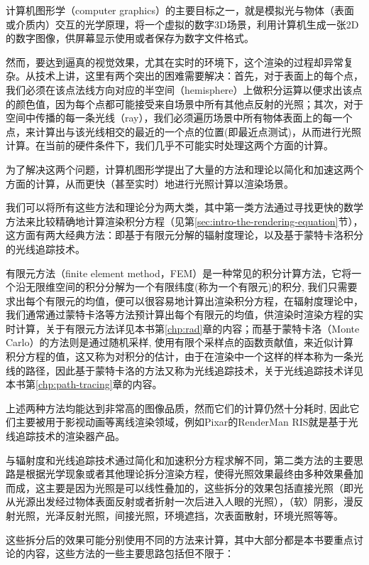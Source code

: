 计算机图形学（computer graphics）的主要目标之一，就是模拟光与物体（表面或介质内）交互的光学原理，将一个虚拟的数字3D场景，利用计算机生成一张2D的数字图像，供屏幕显示使用或者保存为数字文件格式。

然而，要达到逼真的视觉效果，尤其在实时的环境下，这个渲染的过程却异常复杂。从技术上讲，这里有两个突出的困难需要解决：首先，对于表面上的每个点，我们必须在该点法线方向对应的半空间（hemisphere）上做积分运算以便求出该点的颜色值，因为每个点都可能接受来自场景中所有其他点反射的光照；其次，对于空间中传播的每一条光线（ray），我们必须遍历场景中所有物体表面上的每一个点，来计算出与该光线相交的最近的一个点的位置(即最近点测试)，从而进行光照计算。在当前的硬件条件下，我们几乎不可能实时处理这两个方面的计算。

为了解决这两个问题，计算机图形学提出了大量的方法和理论以简化和加速这两个方面的计算，从而更快（甚至实时）地进行光照计算以渲染场景。

我们可以将所有这些方法和理论分为两大类，其中第一类方法通过寻找更快的数学方法来比较精确地计算渲染积分方程（见第\ref{sec:intro-the-rendering-equation}节），这方面有两大经典方法：即基于有限元分解的辐射度理论，以及基于蒙特卡洛积分的光线追踪技术。

有限元方法（finite element method，FEM）是一种常见的积分计算方法，它将一个沿无限维空间的积分分解为一个有限纬度(称为一个有限元)的积分, 我们只需要求出每个有限元的均值，便可以很容易地计算出渲染积分方程，在辐射度理论中，我们通常通过蒙特卡洛等方法预计算出每个有限元的均值，供渲染时渲染方程的实时计算，关于有限元方法详见本书第\ref{chp:rad}章的内容；而基于蒙特卡洛（Monte Carlo）的方法则是通过随机采样, 使用有限个采样点的函数贡献值，来近似计算积分方程的值，这又称为对积分的估计，由于在渲染中一个这样的样本称为一条光线的路径，因此基于蒙特卡洛的方法又称为光线追踪技术，关于光线追踪技术详见本书第\ref{chp:path-tracing}章的内容。

上述两种方法均能达到非常高的图像品质，然而它们的计算仍然十分耗时, 因此它们主要被用于影视动画等离线渲染领域，例如Pixar的RenderMan RIS就是基于光线追踪技术的渲染器产品。

与辐射度和光线追踪技术通过简化和加速积分方程求解不同，第二类方法的主要思路是根据光学现象或者其他理论拆分渲染方程，使得光照效果最终由多种效果叠加而成，这主要是因为光照是可以线性叠加的，这些拆分的效果包括直接光照（即光从光源出发经过物体表面反射或者折射一次后进入人眼的光照），（软）阴影，漫反射光照，光泽反射光照，间接光照，环境遮挡，次表面散射，环境光照等等。

这些拆分后的效果可能分别使用不同的方法来计算，其中大部分都是本书要重点讨论的内容，这些方法的一些主要思路包括但不限于：

